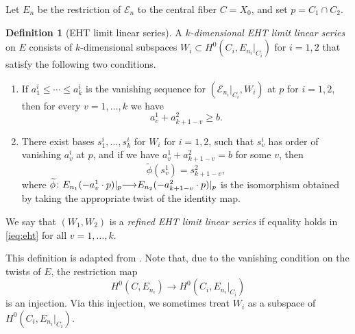 \documentclass[11pt,reqno]{amsart}
\theoremstyle{plain}
\theoremstyle{definition}
\newtheorem{definition}[theorem]{Definition}
\theoremstyle{remark}
\numberwithin{equation}{section}
\renewcommand{\to}{{\longrightarrow}}
\numberwithin{equation}{section}
\begin{document}
Let $E_n$ be the restriction of $\mathcal E_n$ to the central fiber $C = X_0$, and set $p = C_1 \cap C_2$.
\begin{definition}[EHT limit linear series]
  \label{def:eht}
  A \emph{$k$-dimensional EHT limit linear series} on $E$ consists of $k$-dimensional subspaces $W_i \subset H^0(C_i, E_{n_i}|_{C_i})$ for $i = 1, 2$ that satisfy the following two conditions.
  \begin{enumerate}
  \item
    \label{ieq:eht}
    If $a^i_1 \leq \cdots \leq a^i_k$ is the vanishing sequence for $(\mathcal E_{n_i}|_{C_i}, W_i)$ at $p$ for $i = 1, 2$, then for every $v = 1, \dots, k$ we have
    \[ a^1_v + a^2_{k+1-v} \geq b.\]
  \item\label{gluing:eht}
    There exist bases $s^i_1, \dots, s^i_k$ for $W_i$ for $i = 1, 2$, such that $s^i_v$ has order of vanishing $a^i_v$ at $p$, and if we have $a^1_v + a^2_{k+1-v} = b$ for some $v$, then
    \[ \widetilde \phi (s^1_v) = s^2_{k+1-v},\]
    where $\widetilde \phi \from E_{n_1}(-a^1_{v}\cdot p)|_p \to E_{n_2}(-a^2_{k+1-v} \cdot p) |_p$ is the isomorphism obtained by taking the appropriate twist of the identity map.
  \end{enumerate}
  We say that $(W_1, W_2)$ is a \emph{refined EHT limit linear series} if equality holds in \eqref{ieq:eht} for all $v = 1, \dots, k$.
\end{definition}
This definition is adapted from \cite[Definition~4.1.2]{oss:14}.
Note that, due to the vanishing condition on the twists of $E$, the restriction map
\[ H^0(C, E_{n_i}) \to H^0(C_i, E_{n_i}|_{C_i})\]
is an injection.
Via this injection, we sometimes treat $W_i$ as a subspace of $H^0(C_i, E_{n_i}|_{C_i})$.
\end{document}
